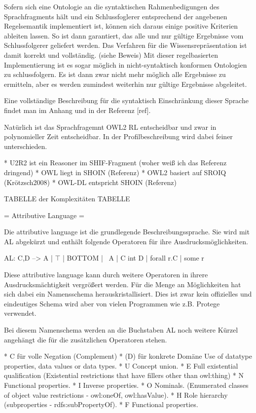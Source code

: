 Sofern sich eine Ontologie an die syntaktischen Rahmenbedigungen des Sprachfragments hält und ein Schlussfoglerer entsprechend der angebenen Regelsemantik implementiert ist, können sich daraus einige positive Kriterien ableiten lassen. So ist dann garantiert, das alle und nur gültige Ergebnisse vom Schlussfolgerer geliefert werden. Das Verfahren für die Wissensrepräsentation ist damit korrekt und vollständig. (siehe Beweis)
Mit dieser regelbasierten Implementierung ist es sogar möglich in nicht-syntaktisch konformen Ontologien zu schlussfolgern. Es ist dann zwar nicht mehr möglich alle Ergebnisse zu ermitteln, aber es werden zumindest weiterhin nur gültige Ergebnisse abgeleitet.

Eine vollständige Beschreibung für die syntaktisch Einschränkung dieser Sprache findet man im Anhang und in der Referenz [ref].

Natürlich ist das Sprachfragemnt OWL2 RL entscheidbar und zwar in polynomieller Zeit entscheidbar. In der Profilbeschreibung wird dabei feiner unterschieden.


 * U2R2 ist ein Reasoner im SHIF-Fragment (woher weiß ich das Referenz dringend)
 * OWL liegt in SHOIN (Referenz)
 * OWL2 basiert auf SROIQ (Krötzsch2008)
 * OWL-DL entspricht SHOIN (Referenz)

TABELLE der Komplexitäten TABELLE



 
= Attributive Language =

Die attributive language ist die grundlegende Beschreibungssprache. Sie wird mit AL abgekürzt und enthält folgende Operatoren für ihre Ausdrucksmöglichkeiten.

AL: C,D --> A | $\top$ | BOTTOM | ~A | C int D | forall r.C | some r

Diese attributive language kann durch weitere Operatoren in ihrere Ausdrucksmächtigkeit vergrößert werden. Für die Menge an Möglichkeiten hat sich dabei ein Namensschema herauskristallisiert. Dies ist zwar kein offizielles und eindeutiges Schema wird aber von vielen Programmen wie z.B. Protege verwendet.

Bei diesem Namenschema werden an die Buchstaben AL noch weitere Kürzel angehängt die für die zusätzlichen Operatoren stehen.

 * C für volle Negation (Complement)
 * (D) für konkrete Domäne  	Use of datatype properties, data values or data types.
 * U Concept union.
 * E Full existential qualification (Existential restrictions that have fillers other than owl:thing)
 * N Functional properties.
 * I Inverse properties.
 * O Nominals. (Enumerated classes of object value restrictions - owl:oneOf, owl:hasValue).
 * H Role hierarchy (subproperties - rdfs:subPropertyOf).
 * F Functional properties.

